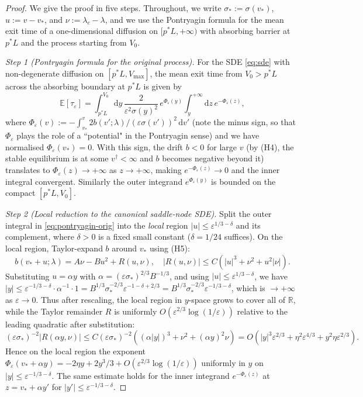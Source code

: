 \documentclass[11pt,a4paper]{article}
\theoremstyle{plain}
\theoremstyle{definition}
\newcommand{\R}{\mathbb{R}}
\newcommand{\E}{\mathbb{E}}
\newcommand{\eps}{\varepsilon}
\renewcommand{\d}{\mathrm{d}}
\begin{document}
\begin{proof}
We give the proof in five steps. Throughout, we write $\sigma_* := \sigma(v_*)$, $u := v - v_*$, and $\nu := \lambda_c - \lambda$, and we use the Pontryagin formula for the mean exit time of a one-dimensional diffusion on $[p^*L, +\infty)$ with absorbing barrier at $p^*L$ and the process starting from $V_0$.

\textit{Step 1 (Pontryagin formula for the original process).} For the SDE \eqref{eq:sde} with non-degenerate diffusion on $[p^*L, V_{\max}]$, the mean exit time from $V_0 > p^*L$ across the absorbing boundary at $p^*L$ is given by \cite[\S 5.5]{KaratzasShreve1991}
\begin{equation}
\E[\tau_\eps] = \int_{p^*L}^{V_0}\d y\,\frac{2}{\eps^2\sigma(y)^2}\,e^{\Phi_\eps(y)}\int_y^{+\infty}\d z\,e^{-\Phi_\eps(z)},
\label{eq:pontryagin-orig}
\end{equation}
where $\Phi_\eps(v) := -\int_{v_*}^v 2 b(v';\lambda)/(\eps\sigma(v'))^2\,\d v'$ (note the minus sign, so that $\Phi_\eps$ plays the role of a ``potential" in the Pontryagin sense) and we have normalised $\Phi_\eps(v_*) = 0$. With this sign, the drift $b < 0$ for large $v$ (by (H4), the stable equilibrium is at some $v^\dagger < \infty$ and $b$ becomes negative beyond it) translates to $\Phi_\eps(z) \to +\infty$ as $z \to +\infty$, making $e^{-\Phi_\eps(z)} \to 0$ and the inner integral convergent. Similarly the outer integrand $e^{\Phi_\eps(y)}$ is bounded on the compact $[p^*L, V_0]$.

\textit{Step 2 (Local reduction to the canonical saddle-node SDE).} Split the outer integral in \eqref{eq:pontryagin-orig} into the \emph{local} region $|u| \leq \eps^{1/3-\delta}$ and its complement, where $\delta > 0$ is a fixed small constant ($\delta = 1/24$ suffices). On the local region, Taylor-expand $b$ around $v_*$ using (H5):
$$b(v_*+u;\lambda) = A\nu - B u^2 + R(u,\nu),\quad |R(u,\nu)| \leq C(|u|^3 + \nu^2 + u^2|\nu|).$$
Substituting $u = \alpha y$ with $\alpha = (\eps\sigma_*)^{2/3} B^{-1/3}$, and using $|u| \leq \eps^{1/3-\delta}$, we have $|y| \leq \eps^{-1/3-\delta}\cdot\alpha^{-1}\cdot 1 = B^{1/3}\sigma_*^{-2/3}\eps^{-1-\delta+2/3} = B^{1/3}\sigma_*^{-2/3}\eps^{-1/3-\delta}$, which is $\to+\infty$ as $\eps\to 0$. Thus after rescaling, the local region in $y$-space grows to cover all of $\R$, while the Taylor remainder $R$ is uniformly $O(\eps^{2/3}\log(1/\eps))$ relative to the leading quadratic after substitution:
$$(\eps\sigma_*)^{-2}|R(\alpha y,\nu)| \leq C(\eps\sigma_*)^{-2}((\alpha|y|)^3 + \nu^2 + (\alpha y)^2\nu) = O(|y|^3\eps^{2/3} + \eta^2\eps^{4/3} + y^2\eta\eps^{2/3}).$$
Hence on the local region the exponent $\Phi_\eps(v_*+\alpha y) = -2\eta y + 2y^3/3 + O(\eps^{2/3}\log(1/\eps))$ uniformly in $y$ on $|y|\leq \eps^{-1/3-\delta}$. The same estimate holds for the inner integrand $e^{-\Phi_\eps(z)}$ at $z = v_*+\alpha y'$ for $|y'|\leq\eps^{-1/3-\delta}$.


\end{proof}
\end{document}
